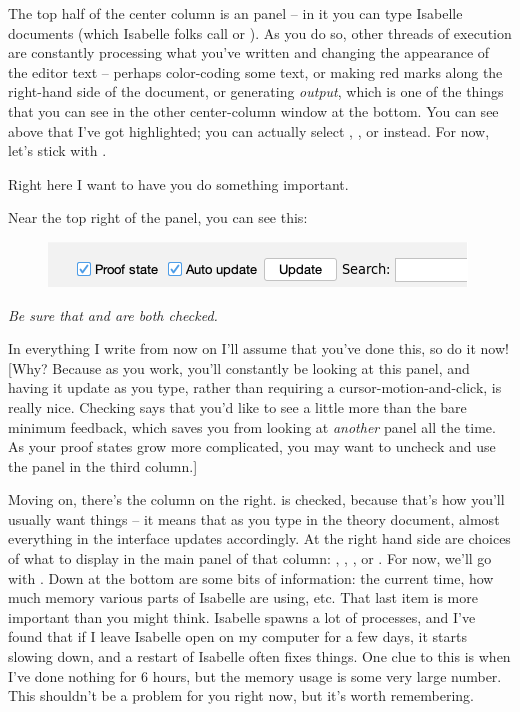 The top half of the center column is an  panel -- in it you can type Isabelle documents (which Isabelle folks call  or ). As you do so, other threads of execution are constantly processing what you've written and changing the appearance of the editor text -- perhaps color-coding some text, or making red marks along the right-hand side of the document, or generating \textit{output}, which is one of the things that you can see in the other center-column window at the bottom. You can see above that I've got  highlighted; you can actually select , , or  instead. For now, let's stick with . 

Right here I want to have you do something important. 

\task
Near the top right of the 
 panel, you can see this:
\begin{figure}[h]
    \centering
    \includegraphics[width=0.75\linewidth]{C01//Images/image.png}
\end{figure}
\textit{Be sure that  and  are both checked.} 
\etask

In everything I write from now on I'll assume that you've done this, so do it now! [Why? Because as you work, you'll constantly be looking at this panel, and having it update as you type, rather than requiring a cursor-motion-and-click, is really nice. Checking  says that you'd like to see a little more than the bare minimum feedback, which saves you from looking at \textit{another} panel all the time. As your proof states grow more complicated, you may want to uncheck  and use the  panel in the third column.]

Moving on, there's the column on the right.  is checked, because that's how you'll usually want things -- it means that as you type in the theory document, almost everything in the interface updates accordingly. At the right hand side are choices of what to display in the main panel of that column: , , , or . For now, we'll go with . Down at the bottom are some bits of information: the current time, how much memory various parts of Isabelle are using, etc. That last item is more important than you might think. Isabelle spawns a lot of processes, and I've found that if I leave Isabelle open on my computer for a few days, it starts slowing down, and a restart of Isabelle often fixes things. One clue to this is when I've done nothing for 6 hours, but the memory usage is some very large number. This shouldn't be a problem for you right now, but it's worth remembering.  

